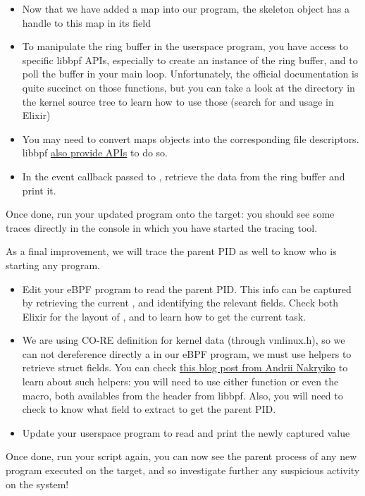 \begin{itemize}
  \begin{itemize}
    \item Now that we have added a map into our program, the skeleton object has a handle to this map in its  field
    \item To manipulate the ring buffer in the userspace program, you have
    access to specific libbpf APIs, especially  to
    create an instance of the ring buffer, and  to poll
    the buffer in your main loop. Unfortunately, the official documentation is
    quite succinct on those functions, but you can take a look at the
     directory in the kernel source tree to learn how to
    use those (search for  and
     usage in Elixir)
    \item You may need to convert maps objects into the corresponding file descriptors. libbpf \href{https://libbpf.readthedocs.io/en/latest/api.html}{also provide APIs} to do so.
    \item In the event callback passed to , retrieve the data from the ring buffer and print it.
  \end{itemize}
\end{itemize}

Once done, run your updated program onto the target: you should see some traces directly in the console in which you have started the tracing tool.

As a final improvement, we will trace the parent PID as well to know who is starting any program.
\begin{itemize}
  \item Edit your eBPF program to read the parent PID. This info can be captured by retrieving the current , and identifying the relevant fields. Check both Elixir for the layout of , and  to learn how to get the current task.
  \item We are using CO-RE definition for kernel data (through vmlinux.h), so
  we can not dereference directly a  in our eBPF
  program, we must use helpers to retrieve struct fields. You can check
  \href{https://nakryiko.com/posts/bpf-core-reference-guide/#the-missing-manual}{this
  blog post from Andrii Nakryiko} to learn about such helpers: you will need to
  use either  function or even the 
  macro, both availables from the  header from
  libbpf. Also, you will  need to check  to know what
  field to extract to get the parent PID.
  \item Update your userspace program to read and print the newly captured value
\end{itemize}

Once done, run your script again, you can now see the parent process of any new
program executed on the target, and so investigate further any suspicious
activity on the system!
